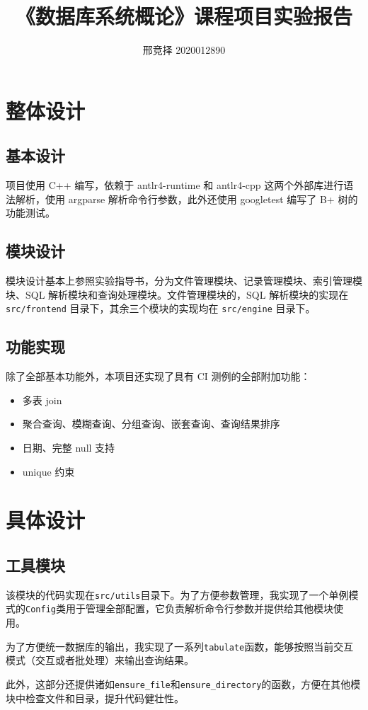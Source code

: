 \documentclass{ctexart}
\title{\heiti 《数据库系统概论》课程项目实验报告}
\author{\kaishu 邢竞择 2020012890}
\begin{document}
\maketitle
\section{整体设计}
\subsection{基本设计}
项目使用 C++ 编写，依赖于 antlr4-runtime 和 antlr4-cpp 这两个外部库进行语法解析，使用 argparse 解析命令行参数，此外还使用 googletest 编写了 B+ 树的功能测试。
\subsection{模块设计}
模块设计基本上参照实验指导书，分为文件管理模块、记录管理模块、索引管理模块、SQL 解析模块和查询处理模块。文件管理模块的，SQL 解析模块的实现在 \texttt{src/frontend} 目录下，其余三个模块的实现均在 \texttt{src/engine} 目录下。
\subsection{功能实现}
除了全部基本功能外，本项目还实现了具有 CI 测例的全部附加功能：
\begin{itemize}
	\item 多表 join
	\item 聚合查询、模糊查询、分组查询、嵌套查询、查询结果排序
	\item 日期、完整 null 支持
	\item unique 约束
\end{itemize}

\section{具体设计}
\subsection{工具模块}
该模块的代码实现在\texttt{src/utils}目录下。为了方便参数管理，我实现了一个单例模式的\texttt{Config}类用于管理全部配置，它负责解析命令行参数并提供给其他模块使用。

为了方便统一数据库的输出，我实现了一系列\texttt{tabulate}函数，能够按照当前交互模式（交互或者批处理）来输出查询结果。

此外，这部分还提供诸如\texttt{ensure\_file}和\texttt{ensure\_directory}的函数，方便在其他模块中检查文件和目录，提升代码健壮性。
\end{document}
